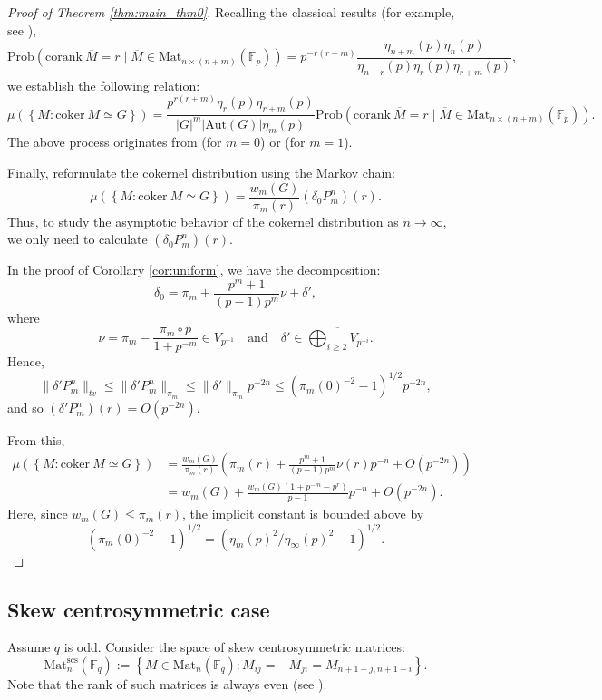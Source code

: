 \documentclass[a4]{amsart}
\newcommand{\Prob}{{\mathrm{Prob}}}
\newcommand{\Mat}{{\mathrm{Mat}}}
\newcommand{\Aut}{{\mathrm{Aut}}}
\newcommand{\scs}{\mathrm{scs}}
\newcommand{\coker}{\mathrm{coker~}}
\newcommand{\corank}{\mathrm{corank~}}
\theoremstyle{remark} \newtheorem{remark}[theorem]{Remark}
\begin{document}
\begin{proof}[Proof of Theorem \ref{thm:main_thm0}]
Recalling the classical results (for example, see \cite{fulman2015Steins}),
\[
\Prob(\corank \overline{M} = r \mid \overline{M} \in \Mat_{n \times (n + m)}(\mathbb{F}_p)) = p^{-r(r + m)} \frac{\eta_{n + m}(p) \eta_n(p)}{\eta_{n - r}(p) \eta_r(p) \eta_{r + m}(p)},
\]
we establish the following relation:
\[
\mu\left(\left\{ M : \coker M \simeq G \right\}\right) = \frac{p^{r(r + m)} \eta_r(p) \eta_{r + m}(p)}{|G|^m |\Aut(G)| \eta_m(p)} \Prob\left(\corank \overline{M} = r \mid \overline{M} \in \Mat_{n \times (n + m)}(\mathbb{F}_p)\right).
\]
The above process originates from \cite[Proposition 1]{friedman1989Distribution} (for $m = 0$) or \cite[Proposition 14.1]{koymans2021Distribution} (for $m = 1$).

Finally, reformulate the cokernel distribution using the Markov chain:
\[
\mu\left(\left\{ M : \coker M \simeq G \right\}\right) = \frac{w_m(G)}{\pi_m(r)} (\delta_0 P_m^n)(r).
\]
Thus, to study the asymptotic behavior of the cokernel distribution as $n \to \infty$, we only need to calculate $(\delta_0 P_m^n)(r)$.

In the proof of Corollary \ref{cor:uniform}, we have the decomposition:
\[
\delta_0 = \pi_m + \frac{p^m + 1}{(p - 1) p^m} \nu + \delta',
\]
where
\[
\nu = \pi_m - \frac{\pi_m \circ p}{1 + p^{-m}} \in V_{p^{-1}} \quad \text{and} \quad \delta' \in \overline{\bigoplus_{i \geq 2} V_{p^{-i}}}.
\]
Hence,
\[
\|\delta' P_m^n\|_{tv} \leq \|\delta' P_m^n\|_{\pi_m} \leq \|\delta'\|_{\pi_m}  p^{-2n} \leq \left(\pi_m(0)^{-2} - 1\right)^{1/2}  p^{-2n},
\]
and so $(\delta' P_m^n)(r) = O(p^{-2n})$.

From this,
\[
\begin{split}
\mu\left(\left\{ M : \coker M \simeq G \right\}\right) &= \frac{w_m(G)}{\pi_m(r)}  \left(\pi_m(r) + \frac{p^m + 1}{(p - 1) p^m} \nu(r)  p^{-n} + O(p^{-2n})\right) \\
&= w_m(G) + \frac{w_m(G) (1 + p^{-m} - p^r)}{p - 1} p^{-n} + O(p^{-2n}).
\end{split}
\]
Here, since $w_m(G)\leq \pi_m(r)$, the implicit constant is bounded above by
\[
\left(\pi_m(0)^{-2} - 1\right)^{1/2} = \left(\eta_m(p)^2/\eta_\infty(p)^2 - 1\right)^{1/2} .
\]
\end{proof}

\medskip
\subsection{Skew centrosymmetric case}
Assume $q$ is odd. Consider the space of skew centrosymmetric matrices:
\[
\Mat^{\scs}_n(\mathbb{F}_q) := \left\{ M \in \Mat_n(\mathbb{F}_q) : M_{ij} = -M_{ji} = M_{n+1-j,n+1-i} \right\}.
\]
Note that the rank of such matrices is always even (see \cite{fulman2015Steins}). 
\end{document}
